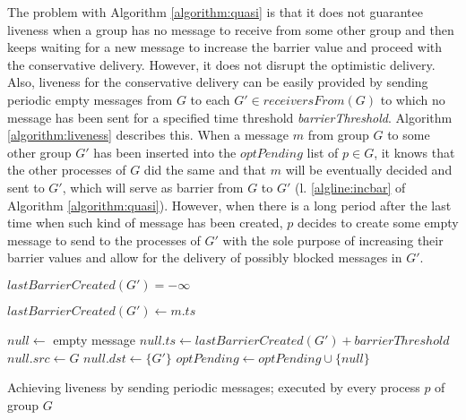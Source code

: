 \documentclass[times, 10pt]{article}
\begin{document}
The problem with Algorithm \ref{algorithm:quasi} is that it does not guarantee liveness when a group has no message to receive from some other group and then keeps waiting for a new message to increase the barrier value and proceed with the conservative delivery. However, it does not disrupt the optimistic delivery. Also, liveness for the conservative delivery can be easily provided by sending periodic empty messages from $G$ to each $G' \in receiversFrom(G)$ to which no message has been sent for a specified time threshold \textit{barrierThreshold}. Algorithm \ref{algorithm:liveness} describes this. When a message $m$ from group $G$ to some other group $G'$ has been inserted into the $optPending$ list of $p \in G$, it knows that the other processes of $G$ did the same and that $m$ will be eventually decided and sent to $G'$, which will serve as barrier from $G$ to $G'$ (l. \ref{algline:incbar} of Algorithm \ref{algorithm:quasi}). However, when there is a long period after the last time when such kind of message has been created, $p$ decides to create some empty message to send to the processes of $G'$ with the sole purpose of increasing their barrier values and allow for the delivery of possibly blocked messages in $G'$.

\begin{algorithm}
\begin{distribalgo}[1]
\blankline
{}
    \STATE $lastBarrierCreated(G') = -\infty$
  \ENDINDENT
\ENDINDENT

\blankline
{}
    \STATE $lastBarrierCreated(G') \leftarrow m.ts$
  \ENDINDENT
\ENDINDENT

\blankline
{}
  \STATE $null \leftarrow$ empty message
  \STATE $null.ts \leftarrow lastBarrierCreated(G') + barrierThreshold$ \label{algline:samenullid}
  \STATE $null.src \leftarrow G$
  \STATE $null.dst \leftarrow \{G'\}$ 
  \STATE $optPending \leftarrow optPending \cup \{null\}$
\ENDINDENT 

\blankline
\caption{Achieving liveness by sending periodic messages; executed by every process $p$ of group $G$}
\label{algorithm:liveness}
\end{distribalgo} 
\end{algorithm}
\end{document}
